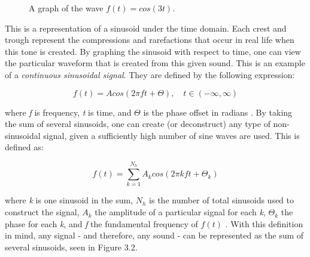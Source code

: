 \begin{figure}[h] %
\begin{center}
	\caption{A graph of the wave \(f(t) = cos(3t)\).}
\end{center}
\end{figure}

This is a representation of a sinusoid under the time domain. Each crest and trough represent the compressions and rarefactions that occur in real life when this tone is created. By graphing the sinusoid with respect to time, one can view the particular waveform that is created from this given sound. This is an example of a \textit{continuous sinusoidal signal}. They are defined by the following expression:

\begin{defn}\label{def1}
	\begin{equation}\label{introf(t)}
	f(t)=Acos(2\pi ft + \varTheta), \quad t \in (-\infty, \infty)
\end{equation}\end{defn}

where \textit{f} is frequency, \textit{t} is time, and $\varTheta$ is the phase offset in radians \cite{Symons_2013}. By taking the sum of several sinusoids, one can create (or deconstruct) any type of non-sinusoidal signal, given a sufficiently high number of sine waves are used. This is defined as:

\begin{defn}\label{def2}
	\begin{equation}\label{intro2f(t)}
	f(t)=\sum_{k=1}^{N_h} A_k cos(2\pi kft + \varTheta_k)
\end{equation}\end{defn}

where \textit{k} is one sinusoid in the sum, $N_h$ is the number of total sinusoids used to construct the signal, $A_k$ the amplitude of a particular signal for each \textit{k}, $\varTheta_k$ the phase for each \textit{k}, and \textit{f} the fundamental frequency of $f(t)$ \cite{Symons_2013}. With this definition in mind, any signal - and therefore, any sound - can be represented as the sum of several sinusoids, seen in Figure 3.2.

